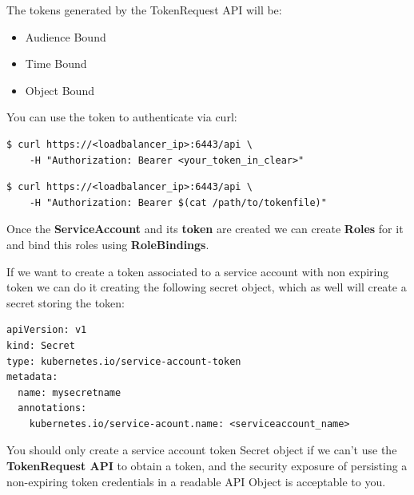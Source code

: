 \documentclass{article}
\newenvironment{blocktemplateI}[1]{%
    \tcolorbox[beamer,%
    noparskip,breakable,
    colframe=Violet,%
    colbacklower=Black,%
    title=#1]}%
    {\endtcolorbox}
\newenvironment{blocktemplateIII}[1]{%
    \tcolorbox[beamer,%
    noparskip,breakable,
    ,colframe=Red,%
    colbacklower=LimeGreen!75!LightGreen,%
    title=#1]}%
    {\endtcolorbox}
\newenvironment{codetemplate}[1][]{%
  \mybasecolorbox[#1]
  \itshape
}{%
  \endmybasecolorbox
}
\begin{document}
The tokens generated by the TokenRequest API will be:
\begin{itemize}
    \item Audience Bound
    \item Time Bound
    \item Object Bound
\end{itemize}

\begin{blocktemplateI}{NOTE}
You can use the token to authenticate via curl:
\begin{codetemplate}{}
\begin{verbatim}
$ curl https://<loadbalancer_ip>:6443/api \
    -H "Authorization: Bearer <your_token_in_clear>"
\end{verbatim}
\end{codetemplate}
\begin{codetemplate}{}
\begin{verbatim}
$ curl https://<loadbalancer_ip>:6443/api \
    -H "Authorization: Bearer $(cat /path/to/tokenfile)"
\end{verbatim}
\end{codetemplate}
\end{blocktemplateI}

Once the \textbf{ServiceAccount} and its \textbf{token} are created we can create \textbf{Roles} for it and bind this roles using \textbf{RoleBindings}.

\begin{blocktemplateIII}{WARNING}
If we want to create a token associated to a service account with non expiring token we can do it creating the following secret object, which as well will create a secret storing the token:
\begin{codetemplate}{}
\begin{verbatim}
apiVersion: v1
kind: Secret
type: kubernetes.io/service-account-token
metadata:
  name: mysecretname
  annotations:
    kubernetes.io/service-acount.name: <serviceaccount_name>
\end{verbatim}
\end{codetemplate}
You should only create a service account token Secret object if we can't use the \textbf{TokenRequest API} to obtain a token, and the security exposure of persisting a non-expiring token credentials in a readable API Object is acceptable to you.
\end{blocktemplateIII}
\end{document}
